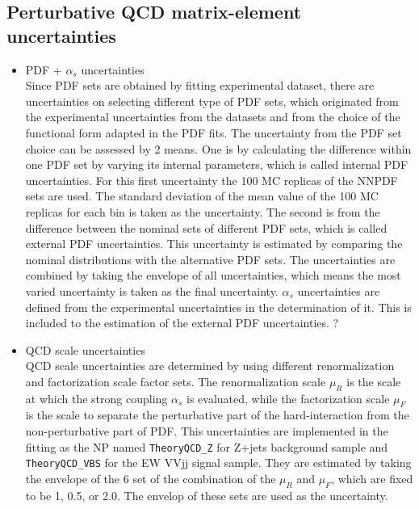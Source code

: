 \subsection{Perturbative QCD matrix-element uncertainties}
\begin{itemize}
\item PDF + $\alpha_s$ uncertainties\\
Since PDF sets are obtained by fitting experimental dataset, there are uncertainties on selecting different type of PDF sets, which originated from the experimental uncertainties from the datasets and from the choice of the functional form adapted in the PDF fits.
The uncertainty from the PDF set choice can be assessed by 2 means. One is by calculating the difference within one PDF set by varying its internal parameters, which is called internal PDF uncertainties. For this first uncertainty the 100 MC replicas of the NNPDF sets are used. The standard deviation of the mean value of the 100 MC replicas for each bin is taken as the uncertainty. The second is from the difference between the nominal sets of different PDF sets, which is called external PDF uncertainties. This uncertainty is estimated by comparing the nominal distributions with the alternative PDF sets. The uncertainties are combined by taking the envelope of all uncertainties, which means the most varied uncertainty is taken as the final uncertainty. 
$\alpha_s$ uncertainties are defined from the experimental uncertainties in the determination of it. This is included to the estimation of the external PDF uncertainties. \textcolor{blue}{?}
\item QCD scale uncertainties\\
QCD scale uncertainties are determined by using different renormalization and factorization scale factor sets. 
The renormalization scale $\mu_R$ is the scale at which the strong coupling $\alpha_s$ is evaluated, while the factorization scale $\mu_F$ is the scale to separate the perturbative part of the hard-interaction from the non-perturbative part of PDF. 
This uncertainties are implemented in the fitting as the NP named \texttt{TheoryQCD\_Z} for Z+jets background sample and \texttt{TheoryQCD\_VBS} for the EW VVjj signal sample. They are estimated by taking the envelope of the 6 set of the combination of the $\mu_R$ and $\mu_F$, which are fixed to be 1, 0.5, or 2.0. The envelop of these sets are used as the uncertainty.
\end{itemize}


